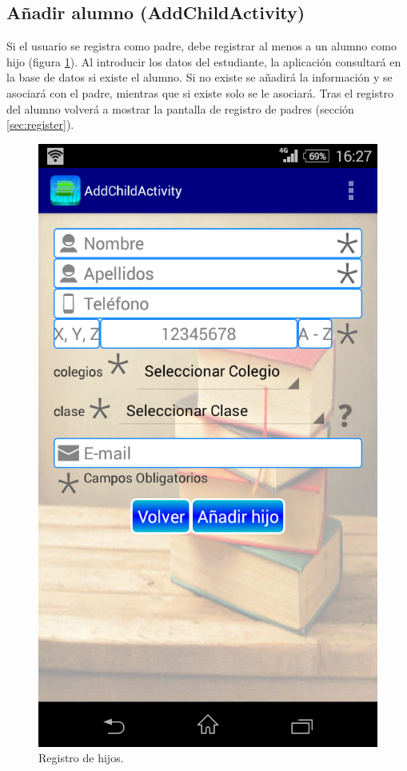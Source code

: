 		\subsection{Añadir alumno ({\ttfamily AddChildActivity})} \label{sec:addChild}
			
			Si el usuario se registra como padre, debe registrar al menos a un alumno como hijo (figura \ref{fig:addChildRegister}). Al introducir los datos del estudiante, la aplicación consultará en la base de datos si existe el alumno. Si no existe se añadirá la información y se asociará con el padre, mientras que si existe solo se le asociará. Tras el registro del alumno volverá a mostrar la pantalla de registro de padres (sección \ref{sec:register}).
			
			\begin{figure}[h !]
				\centering
				\includegraphics[scale=0.3]{Imagenes/App/addChild}
				\caption{Registro de hijos.}
				\label{fig:addChildRegister}
			\end{figure}
		
